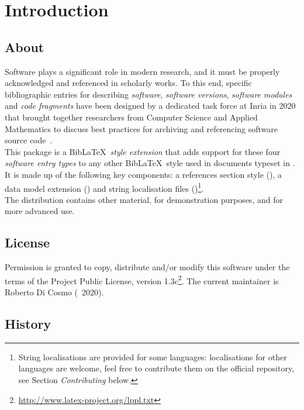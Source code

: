 \documentclass{ltxdockit}
\begin{document}
\printtitlepage
\tableofcontents

\section{Introduction}\label{sec:intro}

\subsection{About}

Software plays a significant role in modern research, and it must be properly
acknowledged and referenced in scholarly works. To this end, specific
bibliographic entries for describing \emph{software}, \emph{software versions},
\emph{software modules} and \emph{code fragments} have been designed by a
dedicated task force at Inria in 2020 that brought together researchers from
Computer Science and Applied Mathematics to discuss best practices for archiving
and referencing software source code~\cite{2020GtCitation}.\\

This package is a Bib\LaTeX\ \emph{style extension} that adds support for these
four \emph{software entry types} to any other Bib\LaTeX\ style used in documents
typeset in \latex. It is made up of the following key components: a references
section style (), a data model extension
() and string localisation files
()\footnote{String localisations are provided for
  some languages: localisations for other languages are welcome, feel free to
  contribute them on the official repository, see Section \emph{Contributing} below.}.\\

The distribution contains other material, for demonstration purposes, and for
more advanced use.

\subsection{License}

Permission is granted to copy, distribute and/or modify this software under
the terms of the \latex Project Public License, version
1.3c\footnote{\url{http://www.latex-project.org/lppl.txt}}. The current
maintainer is Roberto Di Cosmo (\textcopyright\ 2020).

\subsection{History}
\end{document}
